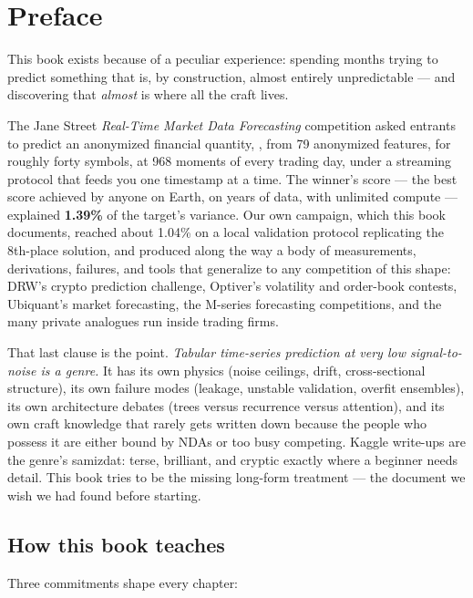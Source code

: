 \chapter*{Preface}

This book exists because of a peculiar experience: spending months trying to
predict something that is, by construction, almost entirely unpredictable ---
and discovering that \emph{almost} is where all the craft lives.

The Jane Street \emph{Real-Time Market Data Forecasting} competition asked
entrants to predict an anonymized financial quantity, , from 79
anonymized features, for roughly forty symbols, at 968 moments of every
trading day, under a streaming protocol that feeds you one timestamp at a
time. The winner's score --- the best score achieved by anyone on Earth, on
years of data, with unlimited compute --- explained \textbf{1.39\%} of the
target's variance. Our own campaign, which this book documents, reached about
1.04\% on a local validation protocol replicating the 8th-place solution, and
produced along the way a body of measurements, derivations, failures, and
tools that generalize to any competition of this shape: DRW's crypto
prediction challenge, Optiver's volatility and order-book contests,
Ubiquant's market forecasting, the M-series forecasting competitions, and the
many private analogues run inside trading firms.

That last clause is the point. \emph{Tabular time-series prediction at very
low signal-to-noise is a genre.} It has its own physics (noise ceilings, drift,
cross-sectional structure), its own failure modes (leakage, unstable
validation, overfit ensembles), its own architecture debates (trees versus
recurrence versus attention), and its own craft knowledge that rarely gets
written down because the people who possess it are either bound by NDAs or
too busy competing. Kaggle write-ups are the genre's samizdat: terse,
brilliant, and cryptic exactly where a beginner needs detail. This book tries
to be the missing long-form treatment --- the document we wish we had found
before starting.

\section*{How this book teaches}

Three commitments shape every chapter:

